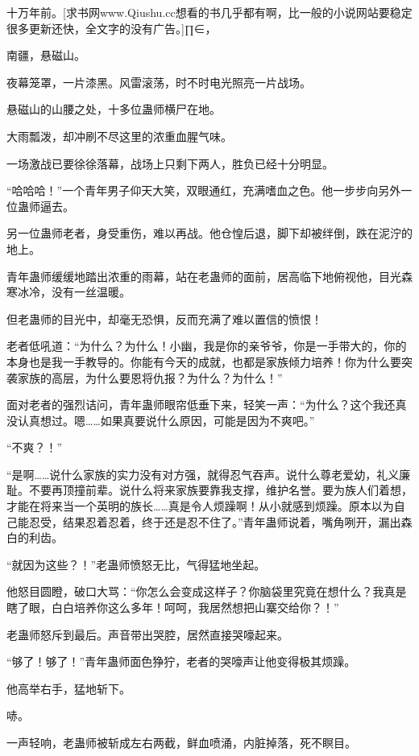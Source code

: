 
\begin{this_body}

十万年前。[求书网www.Qiushu.cc想看的书几乎都有啊，比一般的小说网站要稳定很多更新还快，全文字的没有广告。]∏∈，

南疆，悬磁山。

夜幕笼罩，一片漆黑。风雷滚荡，时不时电光照亮一片战场。

悬磁山的山腰之处，十多位蛊师横尸在地。

大雨瓢泼，却冲刷不尽这里的浓重血腥气味。

一场激战已要徐徐落幕，战场上只剩下两人，胜负已经十分明显。

“哈哈哈！”一个青年男子仰天大笑，双眼通红，充满嗜血之色。他一步步向另外一位蛊师逼去。

另一位蛊师老者，身受重伤，难以再战。他仓惶后退，脚下却被绊倒，跌在泥泞的地上。

青年蛊师缓缓地踏出浓重的雨幕，站在老蛊师的面前，居高临下地俯视他，目光森寒冰冷，没有一丝温暖。

但老蛊师的目光中，却毫无恐惧，反而充满了难以置信的愤恨！

老者低吼道：“为什么？为什么！小幽，我是你的亲爷爷，你是一手带大的，你的本身也是我一手教导的。你能有今天的成就，也都是家族倾力培养！你为什么要突袭家族的高层，为什么要恩将仇报？为什么？为什么！”

面对老者的强烈诘问，青年蛊师眼帘低垂下来，轻笑一声：“为什么？这个我还真没认真想过。嗯……如果真要说什么原因，可能是因为不爽吧。”

“不爽？！”

“是啊……说什么家族的实力没有对方强，就得忍气吞声。说什么尊老爱幼，礼义廉耻。不要再顶撞前辈。说什么将来家族要靠我支撑，维护名誉。要为族人们着想，才能在将来当一个英明的族长……真是令人烦躁啊！从小就感到烦躁。原本以为自己能忍受，结果忍着忍着，终于还是忍不住了。”青年蛊师说着，嘴角咧开，漏出森白的利齿。

“就因为这些？！”老蛊师愤怒无比，气得猛地坐起。

他怒目圆瞪，破口大骂：“你怎么会变成这样子？你脑袋里究竟在想什么？我真是瞎了眼，白白培养你这么多年！呵呵，我居然想把山寨交给你？！”

老蛊师怒斥到最后。声音带出哭腔，居然直接哭嚎起来。

“够了！够了！”青年蛊师面色狰狞，老者的哭嚎声让他变得极其烦躁。

他高举右手，猛地斩下。

哧。

一声轻响，老蛊师被斩成左右两截，鲜血喷涌，内脏掉落，死不瞑目。


\end{this_body}
